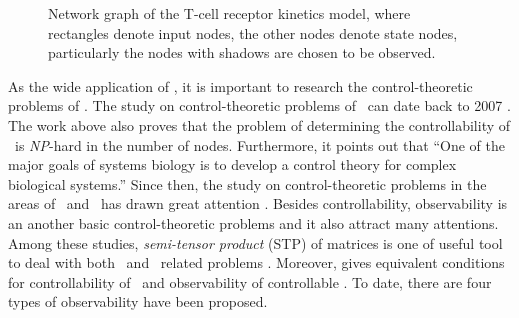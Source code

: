  \begin{figure}[thpb]
      \centering
      
      \caption{Network graph of the T-cell receptor kinetics model, where rectangles denote input nodes, the other nodes denote state nodes, particularly the nodes with shadows are chosen to be observed.}
      \label{fig:6}
  \end{figure}

As the wide application of \BCNs, it is important to research the control-theoretic problems of \BCNs. The study on control-theoretic problems of \BCNs\ can date back to 2007 \cite{Akutsu2007Control}. The work above also proves that the problem of determining the controllability of \BCNs\ is {\em NP}-hard in the number of nodes. Furthermore, it points out that ``One of the major goals of systems biology is to develop a control theory for complex biological systems.'' Since then, the study on control-theoretic problems in the areas of \BNs\ and \BCNs\ has drawn great attention \cite{cheng2009controllability, Zhao2010Input, Cheng2011Identification, Cheng2011Analysis,Fornasini2013Observability}. Besides controllability, observability is an another  basic control-theoretic problems and it also attract many attentions.  Among these studies, \emph{semi-tensor product} (STP) of matrices is one of useful tool to deal with  both \BNs\ and \BCNs\  related problems \cite{cheng2009controllability}.  Moreover,  \cite{cheng2009controllability} gives equivalent conditions for controllability of \BCNs\ and observability of controllable \BCNs. To date, there are four types of observability have been proposed. 

